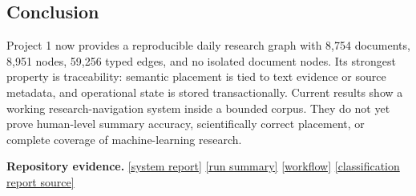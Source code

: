\documentclass[10pt]{article}
\newcommand{\reposource}[2]{\href{#1}{\textcolor{reportblue}{[#2]}}}
\begin{document}
\subsection{Conclusion}

Project 1 now provides a reproducible daily research graph with 8,754 documents,
8,951 nodes, 59,256 typed edges, and no isolated document nodes. Its strongest
property is traceability: semantic placement is tied to text evidence or source
metadata, and operational state is stored transactionally. Current results
show a working research-navigation system inside a bounded corpus. They do not
yet prove human-level summary accuracy, scientifically correct placement, or
complete coverage of machine-learning research.

\vfill
\footnotesize
\textbf{Repository evidence.}
\reposource{https://github.com/garyzhang1006/paper-fetcher/blob/main/docs/PROJECT_1_SYSTEM_REPORT.md}{system report}
\reposource{https://github.com/garyzhang1006/paper-fetcher/blob/main/output/knowledge_graph/summary.json}{run summary}
\reposource{https://github.com/garyzhang1006/paper-fetcher/blob/main/.github/workflows/daily-arxiv-fetch.yml}{workflow}
\reposource{https://github.com/garyzhang1006/paper-fetcher/blob/main/classification/report/arxiv_classification_progress_report.tex}{classification report source}
\end{document}
